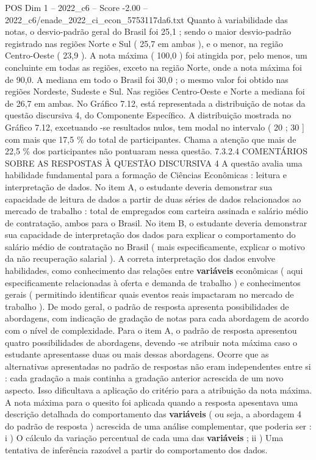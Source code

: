\begin{textsample}{POS Dim 1 – 2022\_c6 – Score -2.00 – 2022\_c6/enade\_2022\_ci\_econ\_5753117da6.txt}
Quanto à variabilidade das notas, o desvio-padrão geral do Brasil foi 25,1 ; sendo o maior desvio-padrão registrado nas regiões Norte e Sul ( 25,7 em ambas ), e o menor, na região Centro-Oeste ( 23,9 ).
A nota máxima ( 100,0 ) foi atingida por, pelo menos, um concluinte em todas as regiões, exceto na região Norte, onde a nota máxima foi de 90,0.
A mediana em todo o Brasil foi 30,0 ; o mesmo valor foi obtido nas regiões Nordeste, Sudeste e Sul.
Nas regiões Centro-Oeste e Norte a mediana foi de 26,7 em ambas.
No Gráfico 7.12, está representada a distribuição de notas da questão discursiva 4, do Componente Específico.
A distribuição mostrada no Gráfico 7.12, excetuando -se resultados nulos, tem modal no intervalo ( 20 ; 30 ] com mais que 17,5 \% do total de participantes.
Chama a atenção que mais de 22,5 \% dos participantes não pontuaram nessa questão. 7.3.2.4 COMENTÁRIOS SOBRE AS RESPOSTAS À QUESTÃO DISCURSIVA 4 A questão avalia uma habilidade fundamental para a formação de Ciências Econômicas : leitura e interpretação de dados.
No item A, o estudante deveria demonstrar sua capacidade de leitura de dados a partir de duas séries de dados relacionados ao mercado de trabalho : total de empregados com carteira assinada e salário médio de contratação, ambos para o Brasil.
No item B, o estudante deveria demonstrar sua capacidade de interpretação dos dados para explicar o comportamento do salário médio de contratação no Brasil ( mais especificamente, explicar o motivo da não recuperação salarial ).
A correta interpretação dos dados envolve habilidades, como conhecimento das relações entre \textbf{variáveis} econômicas ( aqui especificamente relacionadas à oferta e demanda de trabalho ) e conhecimentos gerais ( permitindo identificar quais eventos reais impactaram no mercado de trabalho ).
De modo geral, o padrão de resposta apresenta possibilidades de abordagens, com indicação de gradação de notas para cada abordagem de acordo com o nível de complexidade.
Para o item A, o padrão de resposta apresentou quatro possibilidades de abordagens, devendo -se atribuir nota máxima caso o estudante apresentasse duas ou mais dessas abordagens.
Ocorre que as alternativas apresentadas no padrão de respostas não eram independentes entre si : cada gradação a mais continha a gradação anterior acrescida de um novo aspecto.
Isso dificultava a aplicação do critério para a atribuição da nota máxima.
A nota máxima para o quesito foi aplicada quando a resposta apesentava uma descrição detalhada do comportamento das \textbf{variáveis} ( ou seja, a abordagem 4 do padrão de resposta ) acrescida de uma análise complementar, que poderia ser : i ) O cálculo da variação percentual de cada uma das \textbf{variáveis} ; ii ) Uma tentativa de inferência razoável a partir do comportamento dos dados.

\end{textsample}
